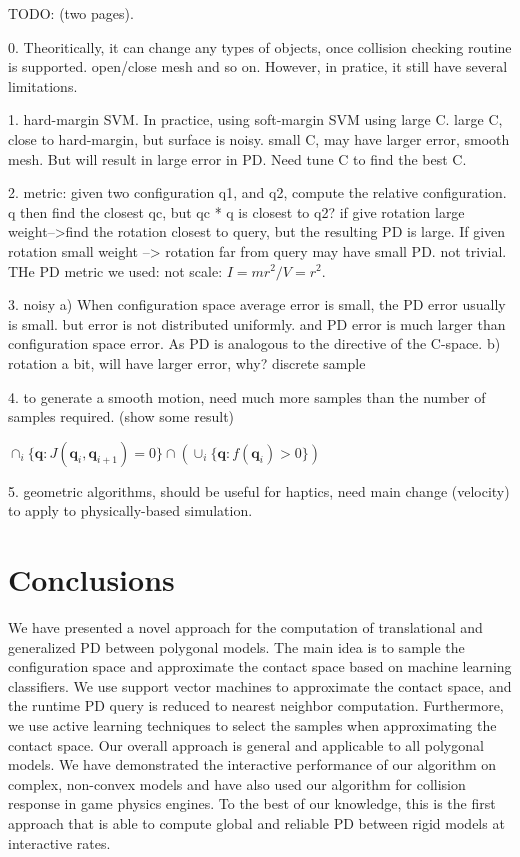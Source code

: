 TODO: (two pages).

0. Theoritically, it can change any types of objects, once collision checking routine is supported. open/close mesh and so on. However, in pratice, it still have several limitations. 

1. hard-margin SVM. In practice, using soft-margin SVM using large C. large C, close to hard-margin, but surface is noisy. small C, may have larger error, smooth mesh. But will result in large error in PD. Need tune C to find the best C.

2. metric: given two configuration q1, and q2, compute the relative configuration. q then find the closest qc, but qc * q is closest to q2? if give rotation large weight-->find the rotation closest to query, but the resulting PD is large. If given rotation small weight --> rotation far from query may have small PD.   not trivial. THe PD metric we used: not scale: $I = mr^2 / V = r^2$.

3. noisy a) When configuration space average error is small, the PD error usually is small. but error is not distributed uniformly. and PD error is much larger than configuration space error. As PD is analogous to the directive of the C-space.   b) rotation a bit, will have larger error, why? discrete sample

4. to generate a smooth motion, need much more samples than the number of samples required. (show some result)

$\cap_i\{\mathbf q: J(\mathbf q_i, \mathbf q_{i+1}) = 0\} \cap (\cup_i \{\mathbf q: f(\mathbf q_i) > 0\})$

5. geometric algorithms, should be useful for haptics, need main change (velocity) to apply to physically-based simulation.



\section{Conclusions}
We have presented a novel approach for the computation of translational and generalized PD between polygonal models.
The main idea is to sample the configuration space and approximate the contact space based on
machine learning classifiers. We use support vector machines to approximate the contact space, and
the runtime PD query is reduced to nearest neighbor computation. Furthermore,
we use active learning techniques to select the samples when approximating the contact space.
Our overall approach is general and applicable to all polygonal models.
We have demonstrated the interactive performance of our algorithm on complex, non-convex models and have also used
our algorithm for collision response in game physics engines.
To the best of our knowledge, this is the first approach that is able to compute global and reliable PD between rigid models at
interactive rates.


